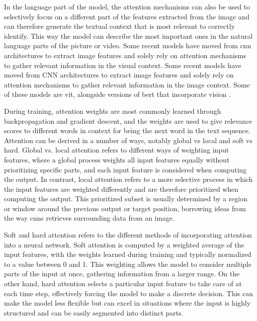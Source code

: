     In the language part of the model, the attention mechanisms can also be used to selectively focus on a different part of the features extracted from the image and can therefore generate the textual context that is most relevant to correctly identify. This way the model can describe the most important ones in the natural language parts of the picture or video. Some recent models have moved from \gls{cnn} architectures to extract image features and solely rely on attention mechanisms to gather relevant information in the visual context. Some recent models have moved from CNN architectures to extract image features and solely rely on attention mechanisms to gather relevant information in the image context. Some of these models are \gls{vit}, alongside versions of \gls{bert} that incorporate vision \cite{leiLessMoreClipBERT2021, liVisualBERTSimplePerformant2019, suVLBERTPretrainingGeneric2020}. %
    
    During training, attention weights are most commonly learned through backpropagation and gradient descent, and the weights are used to give relevance scores to different words in context for being the next word in the text sequence. Attention can be derived in a number of ways, notably global vs local and soft vs hard. Global vs. local attention refers to different ways of weighting input features, where a global process weights all input features equally without prioritizing specific parts, and each input feature is considered when computing the output.
    In contrast, local attention refers to a more selective process in which the input features are weighted differently and are therefore prioritized when computing the output. This prioritized subset is usually determined by a region or window around the previous output or target position, borrowing ideas from the way \glspl{cnn} retrieves surrounding data from an image.
    
    Soft and hard attention refers to the different methods of incorporating attention into a neural network. Soft attention is computed by a weighted average of the input features, with the weights learned during training and typically normalized to a value between 0 and 1. This weighting allows the model to consider multiple parts of the input at once, gathering information from a larger range. On the other hand, hard attention selects a particular input feature to take care of at each time step, effectively forcing the model to make a discrete decision. This can make the model less flexible but can excel in situations where the input is highly structured and can be easily segmented into distinct parts.


